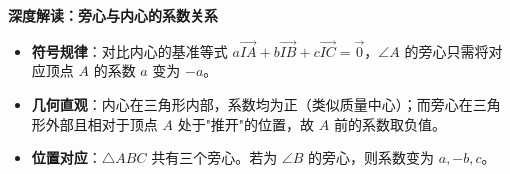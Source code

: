 \begin{explanationbox}
\textbf{深度解读：旁心与内心的系数关系}
\begin{itemize}
    \item \textbf{符号规律}：对比内心的基准等式 $a\vec{IA} + b\vec{IB} + c\vec{IC} = \vec{0}$，$\angle A$ 的旁心只需将对应顶点 $A$ 的系数 $a$ 变为 $-a$。
    \item \textbf{几何直观}：内心在三角形内部，系数均为正（类似质量中心）；而旁心在三角形外部且相对于顶点 $A$ 处于"推开"的位置，故 $A$ 前的系数取负值。
    \item \textbf{位置对应}：$\triangle ABC$ 共有三个旁心。若为 $\angle B$ 的旁心，则系数变为 $a, -b, c$。
\end{itemize}
\end{explanationbox}